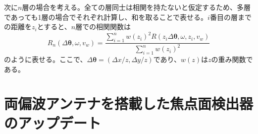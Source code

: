 次に$n$層の場合を考える。全ての層同士は相関を持たないと仮定するため、多層であっても1層の場合でそれぞれ計算し、和を取ることで表せる。$i$番目の層までの距離を$z_{i}$とすると、$n$層での相関関数は
\begin{equation}
  R_{n}(\Delta\bm{\theta},\omega,v_{w}) = \frac{\displaystyle\sum_{i=1}^{n}w(z_{i})^{2}R(z_{i}\Delta\bm{\theta},\omega,z_{i},v_{w})}{\displaystyle\sum_{i=1}^{n}w(z_{i})^{2}}
\end{equation}
のように表せる。ここで、$\Delta\bm{\theta} = (\Delta x/z, \Delta y/z)$であり、$w(z)$は$z$の重み関数である。
\section{両偏波アンテナを搭載した焦点面検出器のアップデート}
